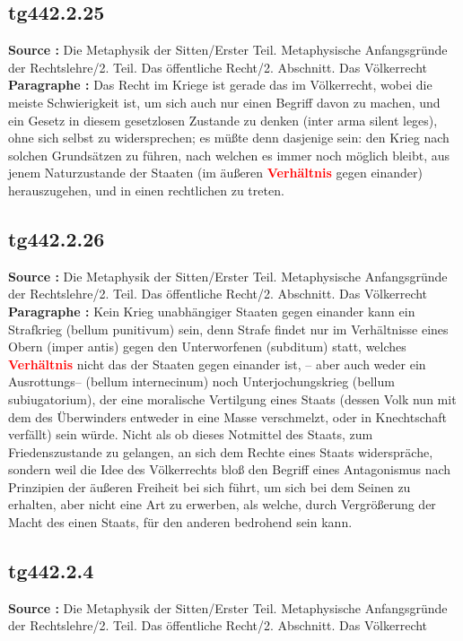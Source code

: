 \documentclass[a4paper,12pt,twoside]{book}
\newcommand{\match}[1]{\textcolor{red}{\textbf{#1}}}
\begin{document}
	\subsection*{tg442.2.25} 
	\textbf{Source : }Die Metaphysik der Sitten/Erster Teil. Metaphysische Anfangsgründe der Rechtslehre/2. Teil. Das öffentliche Recht/2. Abschnitt. Das Völkerrecht\\  
	
	\textbf{Paragraphe : }Das Recht im Kriege ist gerade das im Völkerrecht, wobei die meiste Schwierigkeit ist, um sich auch nur einen Begriff davon zu machen, und ein Gesetz in diesem gesetzlosen Zustande zu denken (inter arma silent leges), ohne sich selbst zu widersprechen; es müßte denn dasjenige sein: den Krieg nach solchen Grundsätzen zu führen, nach welchen es immer noch möglich bleibt, aus jenem Naturzustande der Staaten (im äußeren \match{Verhältnis} gegen einander) herauszugehen, und in einen rechtlichen zu treten. 
	
	\subsection*{tg442.2.26} 
	\textbf{Source : }Die Metaphysik der Sitten/Erster Teil. Metaphysische Anfangsgründe der Rechtslehre/2. Teil. Das öffentliche Recht/2. Abschnitt. Das Völkerrecht\\  
	
	\textbf{Paragraphe : }Kein Krieg unabhängiger Staaten gegen einander kann ein Strafkrieg (bellum punitivum) sein, denn Strafe findet nur im Verhältnisse eines Obern (imper antis) gegen den Unterworfenen (subditum) statt, welches \match{Verhältnis} nicht das der Staaten gegen einander ist, – aber auch weder ein Ausrottungs– (bellum internecinum) noch Unterjochungskrieg (bellum subiugatorium), der eine moralische  Vertilgung eines Staats (dessen Volk nun mit dem des Überwinders entweder in eine Masse verschmelzt, oder in Knechtschaft verfällt) sein würde. Nicht als ob dieses Notmittel des Staats, zum Friedenszustande zu gelangen, an sich dem Rechte eines Staats widerspräche, sondern weil die Idee des Völkerrechts bloß den Begriff eines Antagonismus nach Prinzipien der äußeren Freiheit bei sich führt, um sich bei dem Seinen zu erhalten, aber nicht eine Art zu erwerben, als welche, durch Vergrößerung der Macht des einen Staats, für den anderen bedrohend sein kann. 
	
	\subsection*{tg442.2.4} 
	\textbf{Source : }Die Metaphysik der Sitten/Erster Teil. Metaphysische Anfangsgründe der Rechtslehre/2. Teil. Das öffentliche Recht/2. Abschnitt. Das Völkerrecht\\  
	
\end{document}
